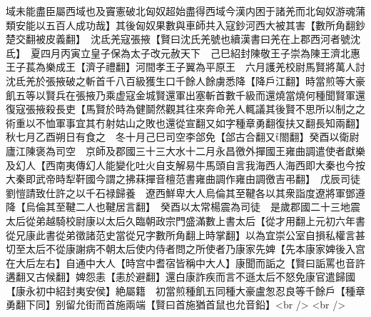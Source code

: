 域未能盡臣屬西域也及竇憲破北匈奴超始盡得西域今漢内困于諸羌而北匈奴游魂蒲類安能以五百人成功哉】其後匈奴果數與車師共入寇鈔河西大被其害【數所角翻鈔楚交翻被皮義翻】　沈氐羌寇張掖【賢曰沈氏羌號也續漢書曰羌在上郡西河者號沈氐】　夏四月丙寅立皇子保為太子改元赦天下　己巳紹封陳敬王子崇為陳王濟北惠王子萇為樂成王【濟子禮翻】河間孝王子翼為平原王　六月護羌校尉馬賢將萬人討沈氐羌於張掖破之斬首千八百級獲生口千餘人餘虜悉降【降戶江翻】時當煎等大豪飢五等以賢兵在張掖乃乘虚寇金城賢還軍出塞斬首數千級而還燒當燒何種聞賢軍還復寇張掖殺長吏【馬賢於時為健鬬然觀其往來奔命羌人輒議其後賢不思所以制之之術重以不恤軍事宜其冇射姑山之敗也還從宣翻又如字種章勇翻復扶又翻長知兩翻】　秋七月乙酉朔日有食之　冬十月己巳司空李郃免【郃古合翻又閤翻】癸酉以衛尉廬江陳褒為司空　京師及郡國三十三大水十二月永昌徼外撣國王雍曲調遣使者獻樂及幻人【西南夷傳幻人能變化吐火自支解易牛馬頭自言我海西人海西即大秦也今按大秦即武帝時犁靬國今謂之拂菻撣音檀范書雍曲調作雍由調徼吉弔翻】　戊辰司徒劉愷請致仕許之以千石禄歸養　遼西鮮卑大人烏倫其至鞬各以其衆詣度遼將軍鄧遵降【烏倫其至鞬二人也鞬居言翻】　癸酉以太常楊震為司徒　是歲郡國二十三地震　太后從弟越騎校尉康以太后久臨朝政宗門盛滿數上書太后【從才用翻上元初六年書從兄康此書從弟徵諸范史當從兄字數所角翻上時掌翻】以為宜崇公室自損私權言甚切至太后不從康謝病不朝太后使内侍者問之所使者乃康家先婢【先本康家婢後入宫在大后左右】自通中大人【時宫中耆宿皆稱中大人】康聞而詬之【賢曰詬罵也音許遘翻又古候翻】婢怨恚【恚於避翻】還白康詐疾而言不遜太后不怒免康官遣歸國【康永初中紹封夷安侯】絶屬籍　初當煎種飢五同種大豪盧怱忍良等千餘戶【種章勇翻下同】别留允街而首施兩端【賢曰首施猶首鼠也允音鉛】<br />
<br />
